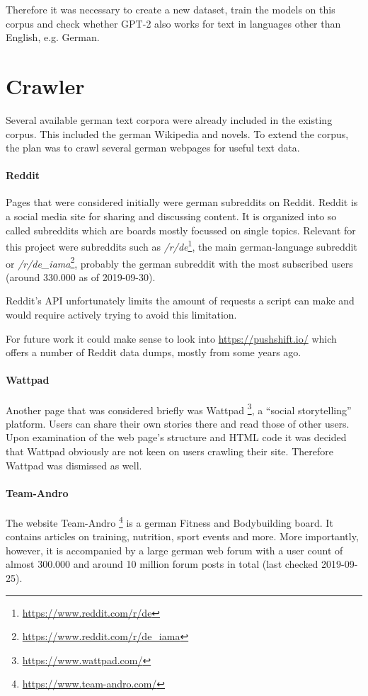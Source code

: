 \documentclass{scrartcl}
\begin{document}
Therefore it was necessary to create a new dataset, train the models on this corpus and check whether GPT-2 also works for text in languages other than English, e.g. German.


\section{Crawler}

Several available german text corpora were already included in the existing corpus. This included the german Wikipedia and novels. 
To extend the corpus, the plan was to crawl several german webpages for useful text data.

\paragraph{Reddit}
Pages that were considered initially were german subreddits on Reddit. Reddit is a social media site for sharing and discussing content. It is organized into so called subreddits which are boards mostly focussed on single topics. Relevant for this project were subreddits such as \textit{/r/de}\footnote{\url{https://www.reddit.com/r/de}}, the main german-language subreddit or \textit{/r/de\_iama}\footnote{\url{https://www.reddit.com/r/de\_iama}}, probably the german subreddit with the most subscribed users (around 330.000 as of 2019-09-30).

Reddit's API unfortunately limits the amount of requests a script can make and would require actively trying to avoid this limitation.

For future work it could make sense to look into \url{https://pushshift.io/} which offers a number of Reddit data dumps, mostly from some years ago.

\paragraph{Wattpad}

Another page that was considered briefly was Wattpad \footnote{\url{https://www.wattpad.com/}}, a \enquote{social storytelling} platform. Users can share their own stories there and read those of other users. Upon examination of the web page's structure and HTML code it was decided that Wattpad obviously are not keen on users crawling their site. Therefore Wattpad was dismissed as well.

\paragraph{Team-Andro} The website Team-Andro \footnote{\url{https://www.team-andro.com/}} is a german Fitness and Bodybuilding board. It contains articles on training, nutrition, sport events and more. More importantly, however, it is accompanied by a large german web forum with a user count of almost 300.000 and around 10 million forum posts in total (last checked 2019-09-25).
\end{document}
